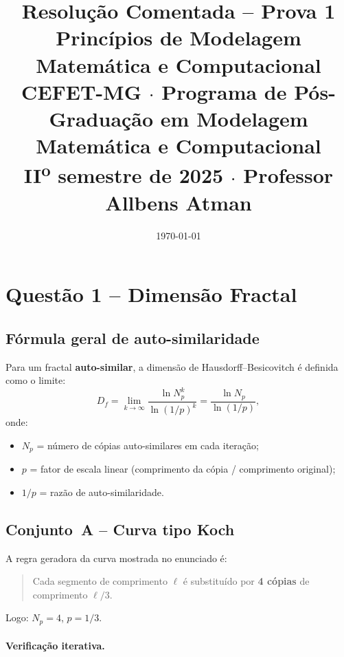 \documentclass[12pt,a4paper]{article}
\title{%
  \textbf{Resolu\c{c}\~ao Comentada -- Prova 1}\\[0.6ex]
  \large Princ\'ipios de Modelagem Matem\'atica e Computacional\\[0.3ex]
  \normalsize CEFET-MG $\cdot$ Programa de P\'os-Gradua\c{c}\~ao em
  Modelagem Matem\'atica e Computacional\\
  II\textsuperscript{o} semestre de 2025 $\cdot$ Professor Allbens Atman
}
\author{}
\date{\today}
\theoremstyle{definition}
\begin{document}

\maketitle
\tableofcontents
\newpage

\section{Quest\~ao 1 -- Dimens\~ao Fractal}

\subsection{F\'ormula geral de auto-similaridade}

Para um fractal \textbf{auto-similar}, a dimens\~ao de Hausdorff--Besicovitch \'e
definida como o limite:
\begin{equation}
  D_f = \lim_{k\to\infty} \frac{\ln N_p^k}{\ln(1/p)^k}
      = \frac{\ln N_p}{\ln(1/p)},
  \label{eq:df}
\end{equation}
onde:
\begin{itemize}
  \item $N_p$ = n\'umero de c\'opias auto-similares em cada itera\c{c}\~ao;
  \item $p$ = fator de escala linear (comprimento da c\'opia / comprimento original);
  \item $1/p$ = raz\~ao de auto-similaridade.
\end{itemize}

\subsection{Conjunto~A -- Curva tipo Koch}

A regra geradora da curva mostrada no enunciado \'e:
\begin{quote}
  Cada segmento de comprimento $\ell$ \'e substitu\'ido por
  \textbf{4 c\'opias} de comprimento $\ell/3$.
\end{quote}
Logo: $N_p = 4$, $p = 1/3$.

\paragraph{Verifica\c{c}\~ao iterativa.}
\end{document}
